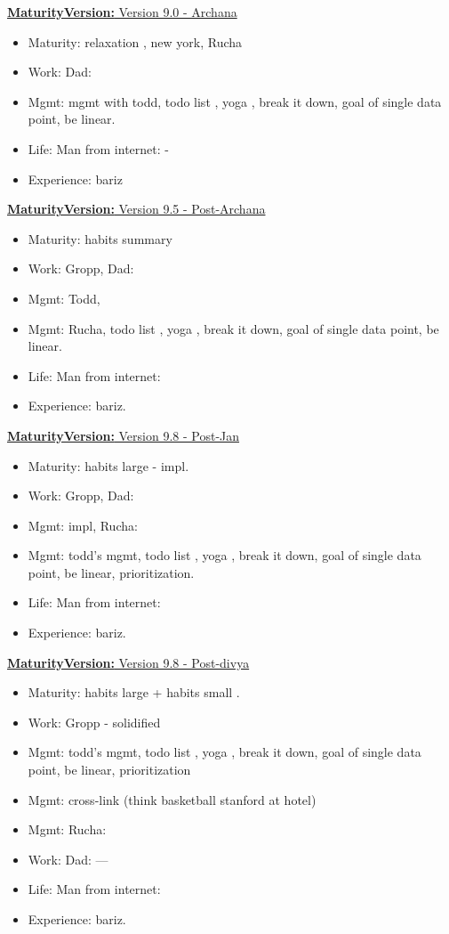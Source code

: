 \documentclass[11pt]{article}
\newcommand{\newMaturityVersion}[1]{\underline{\textbf{MaturityVersion:} #1} }
\begin{document}
\newMaturityVersion{Version 9.0 - Archana}
\begin{itemize} 
\item Maturity: relaxation , new york, Rucha 
\item Work: Dad: 
\item Mgmt: mgmt with todd, todo list , yoga , break it down, goal of single data point,  be linear. 

\item Life: Man from internet: -  
\item Experience: bariz 
\end{itemize}

\newMaturityVersion{Version 9.5 - Post-Archana  }
\begin{itemize} 
\item Maturity: habits summary 
\item Work: Gropp,  Dad:   

\item Mgmt: Todd, 
\item Mgmt: Rucha, todo list , yoga , break it down, goal of single data point, be linear. 

\item Life: Man from internet:  
\item Experience: bariz. 
\end{itemize}

\newMaturityVersion{Version 9.8 - Post-Jan}
\begin{itemize} 
\item Maturity: habits large - impl. 

\item Work: Gropp, Dad:  

\item Mgmt: impl, Rucha:  
\item Mgmt: todd's mgmt, todo list , yoga , break it down, goal of single data point, be linear, prioritization. 

\item Life: Man from internet:  
\item Experience: bariz. 
\end{itemize}



\newMaturityVersion{Version 9.8 - Post-divya}
\begin{itemize} 
\item Maturity: habits large + habits small .  

\item Work: Gropp - solidified

\item Mgmt: todd's mgmt, todo list , yoga , break it down, goal of single data point, be linear, prioritization
\item Mgmt: cross-link (think basketball stanford at hotel) 
\item Mgmt: Rucha: 

\item Work: Dad: --- 

\item Life: Man from internet:  
\item Experience: bariz. 
\end{itemize}
\end{document}
